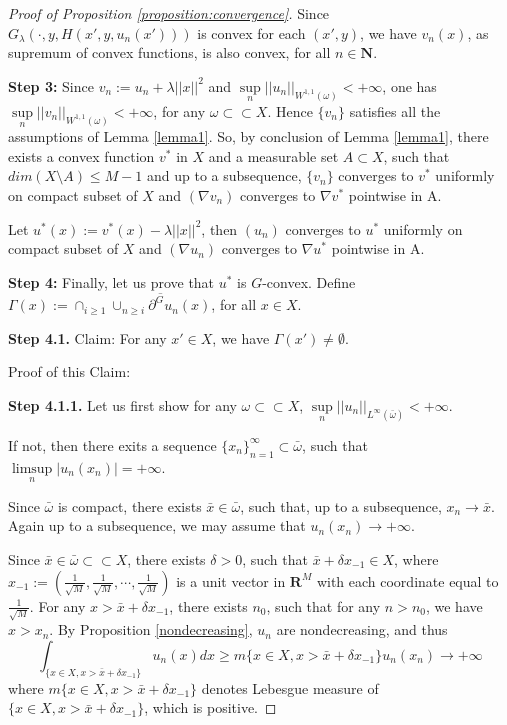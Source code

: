 \documentclass[a4paper, 11pt]{amsart}
\numberwithin{equation}{section}
\theoremstyle{plain}
\theoremstyle{definition}
\theoremstyle{remark}
\newcommand{\R}{\mathbf{R}}
\newcommand{\N}{\mathbf{N}}
\begin{document}
\begin{proof}[Proof of Proposition \ref{proposition:convergence}]
	
	Since $G_{\lambda}(\cdot,y,H(x',y,u_n(x')))$ is convex for each $(x', y)$, we have $v_n(x)$, as supremum of convex functions, is also convex, for all $n \in \N$.\medskip
	
	
	
{\bf Step 3:}	Since $v_n:= u_n +\lambda||x||^2$ and $\sup\limits_{n}||u_n||_{W^{1,1}(\omega)} < +\infty$, one has $\sup\limits_{n}||v_n||_{W^{1,1}(\omega)} < +\infty$, for any $\omega \subset \subset X$. Hence $\{v_n\}$ satisfies all the assumptions of Lemma \ref{lemma1}. So, by conclusion of Lemma \ref{lemma1}, there exists a convex function $v^*$ in $X$ and a measurable set $A \subset X$, such that $dim (X \setminus A)\le M-1$ and up to a subsequence, $\{v_n\}$ converges to $v^*$ uniformly on compact subset of $X$ and $(\nabla v_n)$ converges to $\nabla v^*$ pointwise in A.
	
	Let $u^*(x):=v^*(x)-\lambda||x||^2$, then  $(u_n)$ converges to $u^*$ uniformly on compact subset of $X$ and $(\nabla u_n)$ converges to $\nabla u^*$ pointwise in A.\medskip
	
{\bf Step 4:}	Finally, let us prove that $u^*$ is $G$-convex.\medskip
	Define $\Gamma(x):=\cap_{i\ge 1}\overline{\cup_{n\ge i}\partial^G u_n(x)}$, for all $x\in X$.\medskip
	
	
{\bf	Step 4.1.} Claim: For any $x'\in X$, we have $\Gamma(x') \neq \emptyset$.\medskip
	
	Proof of this Claim: 
	
	{\bf Step 4.1.1.} Let us first show for any $\omega \subset\subset X$, $\sup\limits_{n}||u_n||_{L^{\infty}(\bar{\omega})}<+\infty$.
	
	If not, then there exits a sequence $\{x_n\}_{n=1}^{\infty}\subset \bar{\omega}$, such that $\limsup\limits_{n}|u_n(x_n)|=+\infty$.
	
	Since $\bar{\omega}$ is compact, there exists $\bar{x}\in \bar{\omega}$, such that, up to a subsequence, $x_n\longrightarrow \bar{x}$. Again up to a subsequence, we may assume that $u_n(x_n)\longrightarrow +\infty$.
	
	Since $\bar{x} \in \bar{\omega} \subset \subset X$, there exists $\delta >0$, such that $\bar{x}+\delta x_{-1} \in X$, where $x_{-1}:=(\frac{1}{\sqrt{M}}, \frac{1}{\sqrt{M}}, \cdots, \frac{1}{\sqrt{M}})$ is a unit vector in $\R^M$ with each coordinate equal to $\frac{1}{\sqrt{M}}$. For any $x>\bar{x} + \delta x_{-1}$, there exists $n_0$, such that for any $n>n_0$, we have $x>x_n$. By Proposition \ref{nondecreasing}, $u_n$ are nondecreasing, and thus
	\begin{equation}\label{eqn_integral}
	\int_{\{x\in X, x>\bar{x} +\delta x_{-1}\}} u_n(x)dx \ge m\{x\in X, x> \bar{x}+\delta x_{-1}\} u_n(x_n)\longrightarrow +\infty
	\end{equation}
	where $m\{x\in X, x>\bar{x}+\delta x_{-1}\}$ denotes Lebesgue measure of $\{x\in X, x>\bar{x}+\delta x_{-1}\}$, which is positive.
	

\end{proof}
\end{document}
